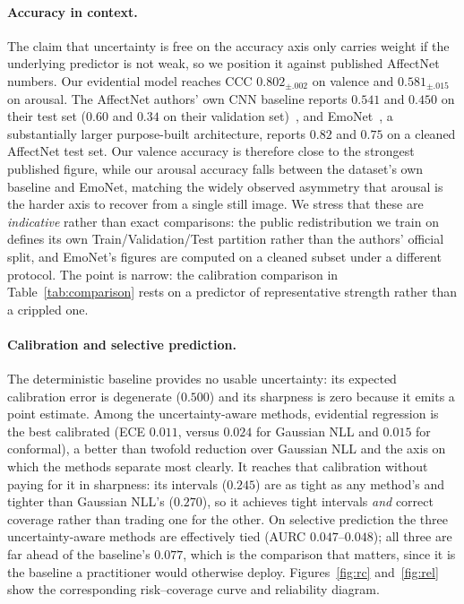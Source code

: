 \paragraph{Accuracy in context.} The claim that uncertainty is free on the
accuracy axis only carries weight if the underlying predictor is not weak, so we
position it against published AffectNet numbers. Our evidential model reaches
CCC $0.802_{\pm.002}$ on valence and $0.581_{\pm.015}$ on arousal. The AffectNet
authors' own CNN baseline reports $0.541$ and $0.450$ on their test set
($0.60$ and $0.34$ on their validation set)~\cite{mollahosseini2017affectnet},
and EmoNet~\cite{toisoul2021estimation}, a substantially larger purpose-built
architecture, reports $0.82$ and $0.75$ on a cleaned AffectNet test set. Our
valence accuracy is therefore close to the strongest published figure, while our
arousal accuracy falls between the dataset's own baseline and EmoNet, matching
the widely observed asymmetry that arousal is the harder axis to recover from a
single still image. We stress that these are \emph{indicative} rather than exact
comparisons: the public redistribution we train on defines its own
Train/Validation/Test partition rather than the authors' official split, and
EmoNet's figures are computed on a cleaned subset under a different protocol. The
point is narrow: the calibration comparison in Table~\ref{tab:comparison}
rests on a predictor of representative strength rather than a crippled one.

\paragraph{Calibration and selective prediction.} The deterministic baseline
provides no usable uncertainty: its expected calibration error is degenerate
($0.500$) and its sharpness is zero because it emits a point estimate. Among the
uncertainty-aware methods, evidential regression is the best calibrated
(ECE $0.011$, versus $0.024$ for Gaussian NLL and $0.015$ for conformal), a
better than twofold reduction over Gaussian NLL and the axis on which the
methods separate most clearly. It reaches that calibration without paying for it in
sharpness: its intervals ($0.245$) are as tight as any method's and tighter than
Gaussian NLL's ($0.270$), so it achieves tight intervals \emph{and} correct
coverage rather than trading one for the other. On selective prediction the three
uncertainty-aware methods are effectively tied (AURC $0.047$--$0.048$); all three
are far ahead of the baseline's $0.077$, which is the comparison that matters,
since it is the baseline a practitioner would otherwise deploy.
Figures~\ref{fig:rc} and~\ref{fig:rel} show the corresponding risk--coverage curve
and reliability diagram.

